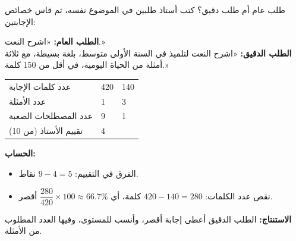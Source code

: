 \documentclass[a4paper]{article}
\begin{document}
\begin{mithal}{طلب عام أم طلب دقيق؟}
كتب أستاذ طلبين في الموضوع نفسه، ثم قاس خصائص الإجابتين:

\textbf{الطلب العام:} «اشرح النعت.»\\
\textbf{الطلب الدقيق:} «اشرح النعت لتلميذ في السنة الأولى متوسط، بلغة بسيطة،
مع ثلاثة أمثلة من الحياة اليومية، في أقل من 150 كلمة.»

\begin{center}
\begin{tabular}{|R{5.5cm}|C{3cm}|C{3cm}|}
    \hline
     &  &  \\ \hline
    عدد كلمات الإجابة            & 420 & 140 \\ \hline
    عدد الأمثلة                  & 1   & 3   \\ \hline
    عدد المصطلحات الصعبة         & 9   & 1   \\ \hline
    تقييم الأستاذ (من 10)        & 4   &  \\ \hline
\end{tabular}
\end{center}

\textbf{الحساب:}
\begin{itemize}
    \item الفرق في التقييم: $9 - 4 = 5$ نقاط.
    \item نقص عدد الكلمات: $420 - 140 = 280$ كلمة،
          أي $\dfrac{280}{420}\times 100 \approx 66.7\%$ أقصر.
\end{itemize}
\textbf{الاستنتاج:} الطلب الدقيق أعطى إجابة أقصر، وأنسب للمستوى، وفيها العدد المطلوب من الأمثلة.
\end{mithal}

\end{document}
